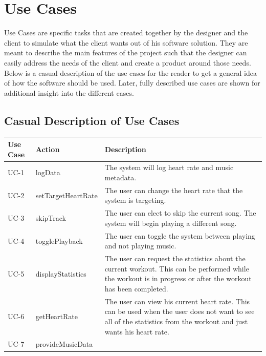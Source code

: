 \documentclass[letterpaper,english, 12pt]{scrreprt}
\begin{document}
\section{Use Cases}
Use Cases are specific tasks that are created together by the designer and the client to simulate what the client wants out of his software solution. They are meant to describe the main features of the project such that the designer can easily address the needs of the client and create a product around those needs. Below is a casual description of the use cases for the reader to get a general idea of how the software should be used. Later, fully described use cases are shown for additional insight into the different cases.

\subsection{Casual Description of Use Cases}
\begin{center}
        \begin{tabular}{|C{2cm}|C{2cm}|C{10cm}|}
                \hline
                        Use Case & Action & Description \\
                \hline
                        UC-1 & logData & The system will log heart rate and music metadata.\\
                \hline
                        UC-2 & setTargetHeartRate & The user can change the heart rate that the system is targeting.\\
                \hline
                        UC-3 & skipTrack & The user can elect to skip the current song. The system will begin playing a different song.\\
                \hline
                        UC-4 & togglePlayback & The user can toggle the system between playing and not playing music.\\
                \hline
                        UC-5 & displayStatistics& The user can request the statistics about the current workout. This can be performed while the workout is in progress or after the workout has been completed. \\
                \hline
                        UC-6 & getHeartRate & The user can view his current heart rate. This can be used when the user does not want to see all of the statistics from the workout and just wants his heart rate. \\
                \hline
                        UC-7 & provideMusicData & \\
                \hline
        \end{tabular}
\end{center}
\end{document}
